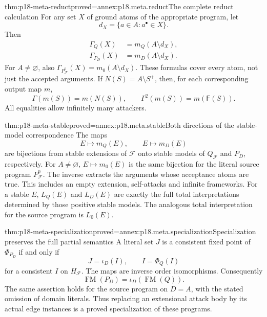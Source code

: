 \begin{hblemma}{thm:p18-meta-reduct}{proved=annex:p18.meta.reduct}{The complete reduct calculation}
For any set \(X\) of ground atoms of the appropriate program, let
\[
                         d_X=\{a\in A:a^\bullet\in X\}.
\]
Then
\[
\begin{aligned}
 \Gamma_Q(X)&=m_Q(A\setminus d_X),\\
 \Gamma_{P_D}(X)&=m_D(A\setminus d_X).
\end{aligned}
\]
For \(A\ne\varnothing\), also
\(\Gamma_{P^0_{\mathcal F}}(X)=m_0(A\setminus d_X)\).
These formulas cover every atom, not just the accepted arguments.
If \(N(S)=A\setminus S^+\), then, for each corresponding output map \(m\),
\[
                   \Gamma(m(S))=m(N(S)),\qquad
                   \Gamma^2(m(S))=m(\mathsf F(S)).
\]
All equalities allow infinitely many attackers.
\end{hblemma}

\begin{hbtheorem}{thm:p18-meta-stable}{proved=annex:p18.meta.stable}{Both directions of the stable-model correspondence}
The maps
\[
                   E\longmapsto m_Q(E),\qquad
                   E\longmapsto m_D(E)
\]
are bijections from stable extensions of \(\mathcal F\) onto
stable models of \(Q_{\mathcal F}\) and \(P_D\), respectively.
For \(A\ne\varnothing\), \(E\mapsto m_0(E)\) is the same
bijection for the literal source program \(P^0_{\mathcal F}\).
The inverse extracts the arguments whose acceptance atoms are true.
This includes an empty extension, self-attacks and infinite frameworks.
For a stable \(E\), \(L_Q(E)\) and \(L_D(E)\) are exactly the full
total interpretations determined by those positive stable models.
The analogous total interpretation for the source program is \(L_0(E)\).
\end{hbtheorem}

\begin{hblemma}{thm:p18-meta-specialization}{proved=annex:p18.meta.specialization}{Specialization preserves the full partial semantics}
A literal set \(J\) is a consistent fixed point of \(\Phi_{P_D}\)
if and only if
\[
                     J=\iota_D(I),\qquad I=\Phi_Q(I)
\]
for a consistent \(I\) on \(H_{\mathcal F}\).
The maps are inverse order isomorphisms. Consequently
\[
                       \operatorname{FM}(P_D)
                                      =\iota_D(\operatorname{FM}(Q)).
\]
The same assertion holds for the source program on \(D=A\), with
the stated omission of domain literals.
Thus replacing an extensional attack body by its actual edge
instances is a proved specialization of these programs.
\end{hblemma}

